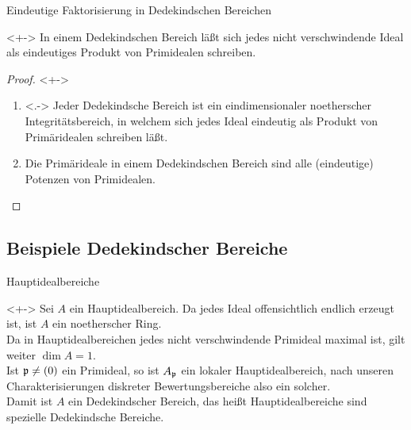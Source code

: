 \begin{frame}{Eindeutige Faktorisierung in Dedekindschen Bereichen}
	\begin{corollary}<+->
		In einem Dedekindschen Bereich läßt sich jedes nicht verschwindende Ideal als
		eindeutiges Produkt von Primidealen schreiben.
	\end{corollary}
	\begin{proof}<+->
		\begin{enumerate}[<+->]
		\item<.->
			Jeder Dedekindsche Bereich ist ein eindimensionaler noetherscher Integritätsbereich,
			in welchem sich jedes Ideal eindeutig als Produkt von Primäridealen schreiben läßt.
		\item
			Die Primärideale in einem Dedekindschen Bereich sind alle (eindeutige) Potenzen von Primidealen.
			\qedhere
		\end{enumerate}
	\end{proof}
\end{frame}

\subsection{Beispiele Dedekindscher Bereiche}

\begin{frame}{Hauptidealbereiche}
	\begin{example}<+->
		Sei \(A\) ein Hauptidealbereich. Da jedes Ideal offensichtlich
		endlich erzeugt ist, ist \(A\) ein noetherscher Ring.
		\\
		Da in Hauptidealbereichen jedes nicht verschwindende Primideal maximal
		ist, gilt weiter \(\dim A = 1\).
		\\
		Ist \(\mathfrak{p} \neq (0)\) ein Primideal, so ist \(A_{\mathfrak{p}}\)
		ein lokaler Hauptidealbereich, nach unseren Charakterisierungen
		diskreter Bewertungsbereiche also ein solcher.
		\\
		Damit ist \(A\) ein Dedekindscher Bereich, das heißt Hauptidealbereiche
		sind spezielle Dedekindsche Bereiche.
	\end{example}
\end{frame}

